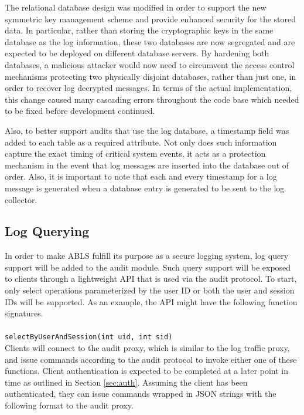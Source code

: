 \documentclass{sig-alternate}
\begin{document}
The relational database design was modified in order to support the new symmetric key management scheme and provide 
enhanced security for the stored data. In particular, rather than storing the cryptographic keys in the same database as the
log information, these two databases are now segregated and are expected to be deployed on different database servers.
By hardening both databases, a malicious attacker would now need to circumvent the access control 
mechanisms protecting two physically disjoint databases, rather than just one, in order to recover log 
decrypted messages. In terms of the actual implementation, this change caused many cascading errors 
throughout the code base which needed to be fixed before development continued.

Also, to better support audits that use the log database, a timestamp field was added to each table as a required
attribute. Not only does such information capture the exact timing of critical system events, it acts as a protection
mechanism in the event that log messages are inserted into the database out of order. Also, it is important to note that
each and every timestamp for a log message is generated when a database entry is generated to be sent to the log 
collector. 

\subsection{Log Querying}
\label{sec:querying}
In order to make ABLS fulfill its purpose as a secure logging system, log query support will be added to the audit
module. Such query support will be exposed to clients through a lightweight API that is used via the audit protocol.
To start, only select operations parameterized by the user ID or both the user and session IDs will be supported. 
As an example, the API might have the following function signatures. \\

 \\
{\tt selectByUserAndSession(int uid, int sid)}\\

Clients will connect to the audit proxy, which is similar to the log traffic proxy, and issue commands according to
the audit protocol to invoke either one of these functions. Client authentication is expected to be completed at a later
point in time as outlined in Section \ref{sec:auth}. Assuming the client has been authenticated, they can issue commands
wrapped in JSON strings with the following format to the audit proxy. \\
\end{document}
